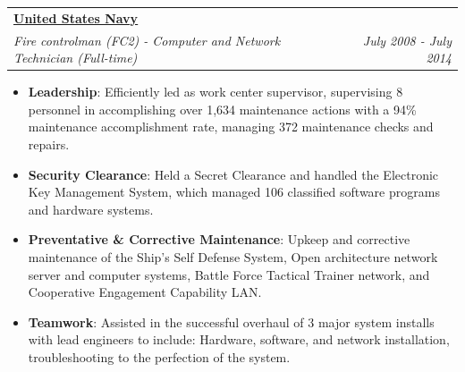 \documentclass[a4paper,20pt]{article}
\makeatletter
\newcommand{\resumeItem}[2]{
  \item\small{
    \textbf{#1}{: #2 \vspace{-2pt}}
  }
}
\newcommand{\resumeSubheading}[4]{
  \vspace{-1pt}\item
    \begin{tabular*}{0.97\textwidth}{l@{\extracolsep{\fill}}r}
      \textbf{#1} & #2 \\
      \textit{#3} & \textit{#4} \\
    \end{tabular*}\vspace{-5pt}
}
\newcommand{\resumeItemListStart}{\begin{itemize}}
\newcommand{\resumeItemListEnd}{\end{itemize}\vspace{-5pt}}
\makeatother
\begin{document}
    \resumeSubheading
    {\underline{\href{https://www.navy.mil/}{United States Navy}}}{}
		{Fire controlman (FC2) - Computer and Network Technician (Full-time)}{July 2008 - July 2014}
		\resumeItemListStart
        \resumeItem{Leadership}
        {Efficiently led as work center supervisor, supervising 8 personnel in accomplishing over 1,634 maintenance actions with a 94\% maintenance accomplishment rate, managing 372 maintenance checks and repairs.}
        \resumeItem{Security Clearance}
        {Held a Secret Clearance and handled the Electronic Key Management System, which managed 106 classified software programs and hardware systems.}
        \resumeItem{Preventative \& Corrective Maintenance}
        {Upkeep and corrective maintenance of the Ship's Self Defense System, Open architecture network server and computer systems, Battle Force Tactical Trainer network, and Cooperative Engagement Capability LAN.}
        \resumeItem{Teamwork}
        {Assisted in the successful overhaul of 3 major system installs with lead engineers to include: Hardware, software, and network installation, troubleshooting to the perfection of the system.}
		\resumeItemListEnd
\resumeSubHeadingListEnd

\end{document}
